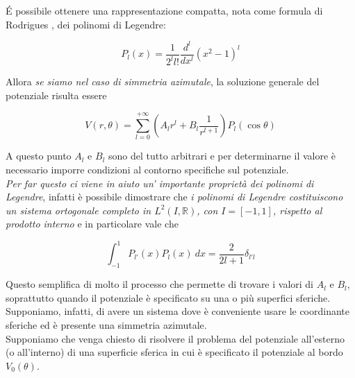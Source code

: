 \' E  possibile ottenere una rappresentazione compatta, nota come formula di Rodrigues , dei polinomi di Legendre:

\begin{tcolorbox}[colback=yellow!10!white, colframe=orange!70!black, boxrule=0.8pt]
\begin{equation}
    P_l (x) = \frac{1}{2^l l !} \frac{d^l}{dx^l} (x^2 - 1)^l
    \label{eq:Rodrigues}
\end{equation}
\end{tcolorbox}

Allora \emph{se siamo nel caso di simmetria azimutale}, la soluzione generale del potenziale risulta essere 

\begin{tcolorbox}[colback=yellow!10!white, colframe=orange!70!black, boxrule=0.8pt]
\begin{equation}
    V(r, \theta) = \sum_{l = 0} ^ {+ \infty} \left ( A_l r^l + B_l \frac{1}{r^{l+1}} \right) P_l (\cos \theta)
\end{equation}
\end{tcolorbox}

A questo punto $A_l$ e $B_l$ sono del tutto arbitrari e per determinarne il valore è necessario imporre condizioni al contorno specifiche sul potenziale. \\

\emph{Per far questo ci viene in aiuto un' importante proprietà dei polinomi di Legendre}, infatti è possibile dimostrare che \emph{i polinomi di Legendre costituiscono un sistema ortogonale completo in $L^2(I,\mathbb{R})$, con $I = [-1,1]$, rispetto al prodotto interno} e in particolare vale che 

\begin{equation}
    \int_{-1}^1 P_{l'} (x) P_{l}(x) \ dx = \frac{2}{2l +1} \delta_{l'l}
\end{equation}

Questo semplifica di molto il processo che permette di trovare i valori di $A_l$ e $B_l$, soprattutto quando il potenziale è specificato su una o più superfici sferiche. \\

Supponiamo, infatti, di avere un sistema dove è conveniente usare le coordinante sferiche ed è presente una simmetria azimutale. \\
Supponiamo che venga chiesto di risolvere il problema del potenziale all'esterno (o all'interno) di una superficie sferica in cui è specificato il potenziale al bordo $V_0 ( \theta)$. \\

